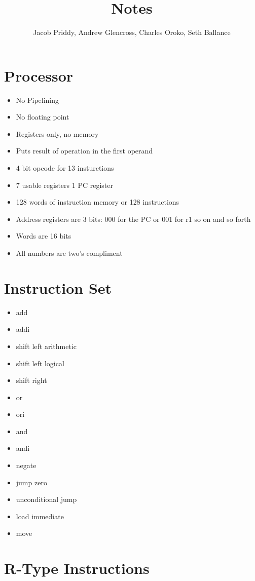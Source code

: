 \documentclass[a4paper]{article}
\title{Notes}
\author{Jacob Priddy, Andrew Glencross, Charles Oroko, Seth Ballance}
\begin{document}
\maketitle

\section{Processor}

\begin{itemize}
\item No Pipelining
\item No floating point
\item Registers only, no memory
\item Puts result of operation in the first operand
\item 4 bit opcode for 13 insturctions
\item 7 usable registers 1 PC register
\item 128 words of instruction memory or 128 instructions
\item Address registers are 3 bits: 000 for the PC or 001 for r1 so on and so forth
\item Words are 16 bits
\item All numbers are two's compliment
\end{itemize}

\section{Instruction Set}
\begin{itemize}
\item add
\item addi
\item shift left arithmetic
\item shift left logical
\item shift right
\item or
\item ori
\item and
\item andi
\item negate
\item jump zero
\item unconditional jump
\item load immediate
\item move
\end{itemize}

\section{R-Type Instructions}
\end{document}

